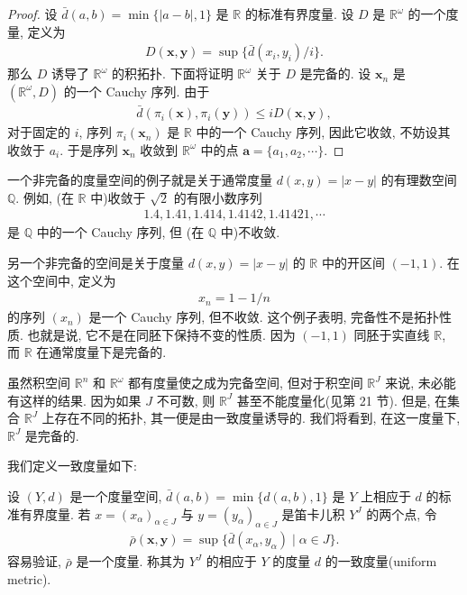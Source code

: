 \documentclass[../../main.tex]{subfiles}
\begin{document}
\begin{proof}
设 $\bar{d}(a,b)=\min\{|a-b|,1\}$ 是 $\mathbb{R}$ 的标准有界度量. 设 $D$ 是 $\mathbb{R}^\omega$ 的一个度量, 定义为
\begin{align*}
D(\mathbf{x},\mathbf{y})=\sup\{\bar{d}(x_i,y_i)/i\}.
\end{align*}
那么 $D$ 诱导了 $\mathbb{R}^\omega$ 的积拓扑. 下面将证明 $\mathbb{R}^\omega$ 关于 $D$ 是完备的. 设 $\mathbf{x}_n$ 是 $(\mathbb{R}^\omega,D)$ 的一个 Cauchy 序列. 由于
\begin{align*}
\bar{d}(\pi_i(\mathbf{x}),\pi_i(\mathbf{y}))\leqslant iD(\mathbf{x},\mathbf{y}),
\end{align*}
对于固定的 $i$, 序列 $\pi_i(\mathbf{x}_n)$ 是 $\mathbb{R}$ 中的一个 Cauchy 序列, 因此它收敛, 不妨设其收敛于 $a_i$. 于是序列 $\mathbf{x}_n$ 收敛到 $\mathbb{R}^\omega$ 中的点 $\mathbf{a}=\{a_1,a_2,\cdots\}$.
\end{proof}

\begin{example}\label{example:ch07-Q-not-complete}
一个非完备的度量空间的例子就是关于通常度量 $d(x,y)=|x-y|$ 的有理数空间 $\mathbb{Q}$. 例如, (在 $\mathbb{R}$ 中)收敛于 $\sqrt{2}$ 的有限小数序列
\begin{align*}
1.4,1.41,1.414,1.4142,1.41421,\cdots
\end{align*}
是 $\mathbb{Q}$ 中的一个 Cauchy 序列, 但 (在 $\mathbb{Q}$ 中)不收敛.
\end{example}

\begin{example}\label{example:ch07-open-interval-not-complete}
另一个非完备的空间是关于度量 $d(x,y)=|x-y|$ 的 $\mathbb{R}$ 中的开区间 $(-1,1)$. 在这个空间中, 定义为
\begin{align*}
x_n=1-1/n
\end{align*}
的序列 $(x_n)$ 是一个 Cauchy 序列, 但不收敛. 这个例子表明, 完备性不是拓扑性质. 也就是说, 它不是在同胚下保持不变的性质. 因为 $(-1,1)$ 同胚于实直线 $\mathbb{R}$, 而 $\mathbb{R}$ 在通常度量下是完备的.
\end{example}

虽然积空间 $\mathbb{R}^n$ 和 $\mathbb{R}^\omega$ 都有度量使之成为完备空间, 但对于积空间 $\mathbb{R}^J$ 来说, 未必能有这样的结果. 因为如果 $J$ 不可数, 则 $\mathbb{R}^J$ 甚至不能度量化(见第 21 节). 但是, 在集合 $\mathbb{R}^J$ 上存在不同的拓扑, 其一便是由一致度量诱导的. 我们将看到, 在这一度量下, $\mathbb{R}^J$ 是完备的.

我们定义一致度量如下:

\begin{definition}\label{definition:ch07-uniform-metric}
设 $(Y,d)$ 是一个度量空间, $\bar{d}(a,b)=\min\{d(a,b),1\}$ 是 $Y$ 上相应于 $d$ 的标准有界度量. 若 $x=(x_\alpha)_{\alpha\in J}$ 与 $y=(y_\alpha)_{\alpha\in J}$ 是笛卡儿积 $Y^J$ 的两个点, 令
\begin{align*}
\bar{\rho}(\mathbf{x},\mathbf{y})=\sup\{\bar{d}(x_\alpha,y_\alpha)\mid\alpha\in J\}.
\end{align*}
容易验证, $\bar{\rho}$ 是一个度量. 称其为 $Y^J$ 的相应于 $Y$ 的度量 $d$ 的一致度量(uniform metric).
\end{definition}
\end{document}
